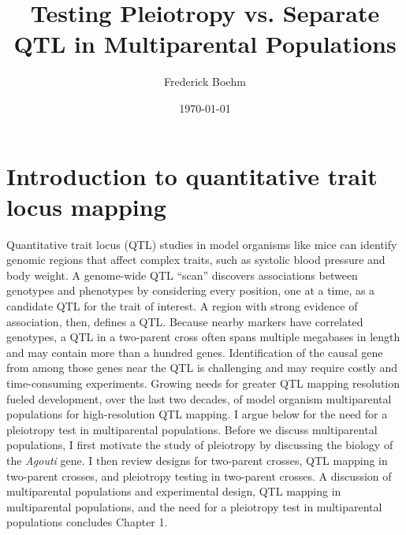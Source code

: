 \documentclass[oneside]{book}\usepackage[]{graphicx}\usepackage[]{color}
\title{Testing Pleiotropy vs. Separate QTL in Multiparental Populations}
\author{Frederick Boehm}
\date{\today}
\begin{document}
\frontmatter %




\doublespacing
\maketitle
\tableofcontents
\listoffigures
\listoftables
\mainmatter %

\chapter{Introduction to quantitative trait locus mapping}

Quantitative trait locus (QTL) studies in model organisms like mice can identify 
genomic regions that affect complex traits, such as systolic blood pressure and body weight.
A genome-wide QTL ``scan'' discovers
associations between genotypes and phenotypes by considering every position, one at a time, as a candidate QTL for the trait of interest.
A region with strong evidence of association, then, defines a QTL. Because nearby markers have correlated
genotypes, a QTL in a two-parent cross often spans multiple megabases in length and may contain more than a hundred genes.
Identification of the causal gene from among those genes near the QTL is challenging and may require costly and time-consuming experiments. 
Growing needs for greater QTL mapping resolution fueled development, over the
last two decades, of model organism multiparental populations for high-resolution QTL mapping.
I argue below for the need for a pleiotropy test in multiparental populations. 
Before we discuss multiparental populations, I first motivate the study of
pleiotropy by discussing the biology of the \emph{Agouti} gene. I then review designs for two-parent crosses, QTL mapping in
two-parent crosses, and pleiotropy testing in two-parent crosses.
A discussion of multiparental populations and experimental design, QTL mapping
in multiparental populations, and the need for a pleiotropy test in
multiparental populations concludes Chapter 1.
\end{document}
